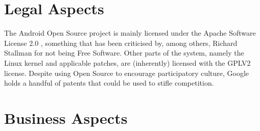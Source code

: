 \documentclass[conference]{IEEEtran}
\begin{document}
\section{Legal Aspects}
\label{legal}

The Android Open Source project is mainly licensed under the Apache Software License 2.0 \cite{apache-license}, something that has been criticised by, among others, Richard Stallman for not being Free Software.\cite{rms-android} Other parts of the system, namely the Linux kernel and applicable patches, are (inherently) licensed with the GPLV2 license.\cite{gplv2}\cite{android-licenses} Despite using Open Source to encourage participatory culture, Google holds a handful of patents that could be used to stifle competition.\cite{google-slide-unlock}\cite{google-radial-menu}


\section{Business Aspects}
\label{financial}
\end{document}
